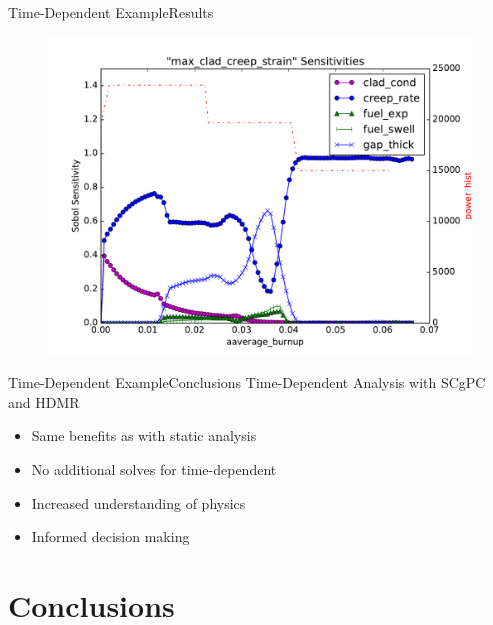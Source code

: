 \documentclass{beamer}
\begin{document}
\begin{frame}{Time-Dependent Example}{Results}\vspace{-20pt}
      \begin{figure}
        \centering
        \includegraphics[width=0.8\linewidth]{oecd/sens_max_clad_creep_strain}
      \end{figure}
\end{frame}

\begin{frame}{Time-Dependent Example}{Conclusions}\vspace{-20pt}
  \vfill
  Time-Dependent Analysis with SCgPC and HDMR
  \vfill
  \begin{itemize}
    \item Same benefits as with static analysis
  \vfill
    \item No additional solves for time-dependent
  \vfill
    \item Increased understanding of physics
  \vfill
    \item Informed decision making
  \end{itemize}
  \vfill
\end{frame}



\section{Conclusions}
\end{document}
